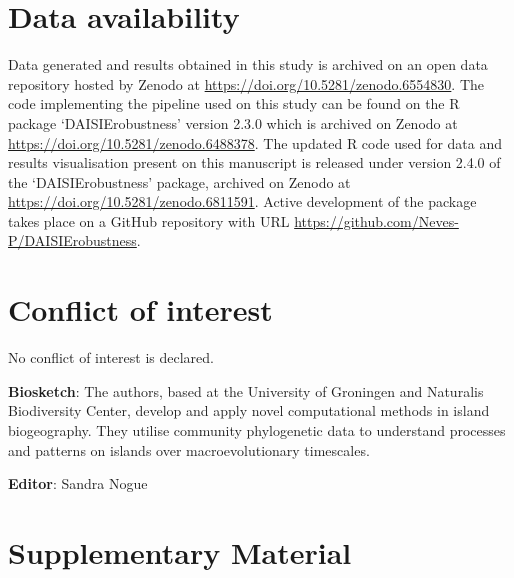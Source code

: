 \documentclass{article}
\begin{document}
\section*{Data availability}

Data generated and results obtained in this study is archived on an open data repository hosted by Zenodo at \url{https://doi.org/10.5281/zenodo.6554830}. The code implementing the pipeline used on this study can be found on the R package `DAISIErobustness' version 2.3.0 which is archived on Zenodo at \url{https://doi.org/10.5281/zenodo.6488378}. The updated R code used for data and results visualisation present on this manuscript is released under version 2.4.0 of the `DAISIErobustness' package, archived on Zenodo at \url{https://doi.org/10.5281/zenodo.6811591}. Active development of the package takes place on a GitHub repository with URL \url{https://github.com/Neves-P/DAISIErobustness}.

\section*{Conflict of interest}

No conflict of interest is declared.





\noindent \textbf{Biosketch}: The authors, based at the University of Groningen and Naturalis Biodiversity Center, develop and apply novel computational methods in island biogeography. They utilise community phylogenetic data to understand processes and patterns on islands over macroevolutionary timescales.

\noindent \textbf{Editor}: Sandra Nogue

\clearpage

\newcommand{\beginsupplement}{%
        \setcounter{table}{0}
        \renewcommand{\thetable}{S\arabic{table}}%
        \setcounter{figure}{0}
        \renewcommand{\thefigure}{S\arabic{figure}}%
     }
     
\beginsupplement
\section*{Supplementary Material}

\end{document}
